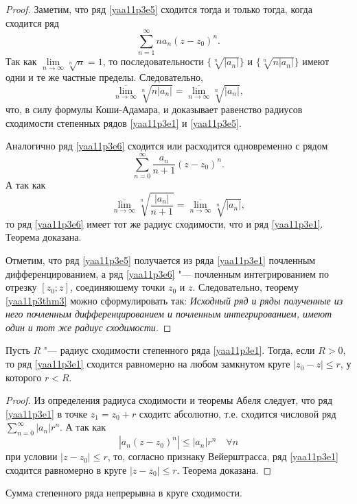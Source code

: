 \begin{proof}
Заметим, что ряд \eqref{yaa11p3e5} сходится тогда и только тогда, когда сходится ряд
$$
\sum\limits_{n=1}^{\infty}na_n(z-z_0)^n.
$$
Так как $\lim\limits_{n\to\infty} \sqrt[n]{n} = 1$, то последовательности $\{\sqrt[n]{|a_n|}\}$ и $\{\sqrt[n]{n|a_n|}\}$ имеют одни и те же частные пределы. Следовательно,
$$
\overline{\lim\limits_{n\to\infty}}\sqrt[n]{n|a_n|}=\overline{\lim\limits_{n\to\infty}}\sqrt[n]{|a_n|},
$$
что, в силу формулы Коши-Адамара, и доказывает равенство радиусов сходимости степенных рядов \eqref{yaa11p3e1} и \eqref{yaa11p3e5}.

Аналогично ряд \eqref{yaa11p3e6} сходится или расходится одновременно с рядом
$$
\sum\limits_{n=0}^{\infty}\frac{a_n}{n+1}(z-z_0)^n.
$$
А так как 
$$
\overline{\lim\limits_{n\to\infty}}\sqrt[n]{\frac{|a_n|}{n+1}}=\overline{\lim\limits_{n\to\infty}}\sqrt[n]{|a_n|},
$$
то ряд \eqref{yaa11p3e6} имеет тот же радиус сходимости, что и ряд \eqref{yaa11p3e1}. Теорема доказана.

Отметим, что ряд \eqref{yaa11p3e5} получается из ряда \eqref{yaa11p3e1} почленным дифференцированием, а ряд \eqref{yaa11p3e6} "--- почленным интегрированием по отрезку $[z_0;z]$, соединяюшему точки $z_0$ и $z$. Следовательно, теорему \eqref{yaa11p3thm3} можно сформулировать так:
\textit{Исходный ряд и ряды полученные из него почленным дифференцированием и почленным интегрированием, имеют один и тот же радиус сходимости.}
\end{proof}

\begin{thm}
Пусть $R$ "--- радиус сходимости степенного ряда \eqref{yaa11p3e1}. Тогда, если $R>0$, то ряд \eqref{yaa11p3e1} сходится равномерно на любом замкнутом круге $|z_0-z|\le r$, у которого $r<R$.
\end{thm}

\begin{proof}
Из определения радиуса сходимости и теоремы Абеля следует, что ряд \eqref{yaa11p3e1} в точке $z_1=z_0+r$ сходитс абсолютно, т.е. сходится числовой ряд $\sum\limits_{n=0}^{\infty} |a_n|r^n$. А так как
$$
|a_n(z-z_0)^n|\le |a_n|r^n \quad \forall n
$$
при условии $|z-z_0|\le r$, то, согласно признаку Вейерштрасса, ряд \eqref{yaa11p3e1} сходится равномерно в круге $|z-z_0|\le r$. Теорема доказана.
\end{proof}

\begin{cons}
Сумма степенного ряда непрерывна в круге сходимости.
\end{cons}

